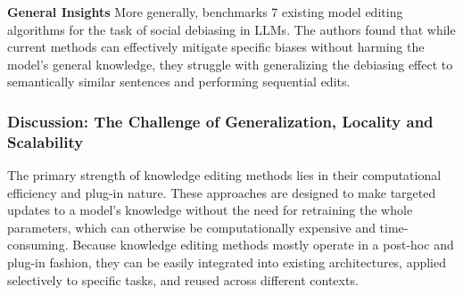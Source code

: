\textbf{General Insights}
More generally, \citet{yan2024potential} benchmarks 7 existing model editing algorithms for the task of social debiasing in LLMs. 
The authors found that while current methods can effectively mitigate specific biases without harming the model's general knowledge, they struggle with generalizing the debiasing effect to semantically similar sentences and performing sequential edits.





\subsubsection{Discussion: The Challenge of Generalization, Locality and Scalability}

The primary strength of knowledge editing methods lies in their  computational efficiency and plug-in nature. These approaches are designed to make targeted updates to a model's knowledge without the need for retraining the whole parameters, which can otherwise be computationally expensive and time-consuming. Because knowledge editing methods mostly operate in a post-hoc and plug-in fashion, they can be easily integrated into existing architectures, applied selectively to specific tasks, and reused across different contexts.

